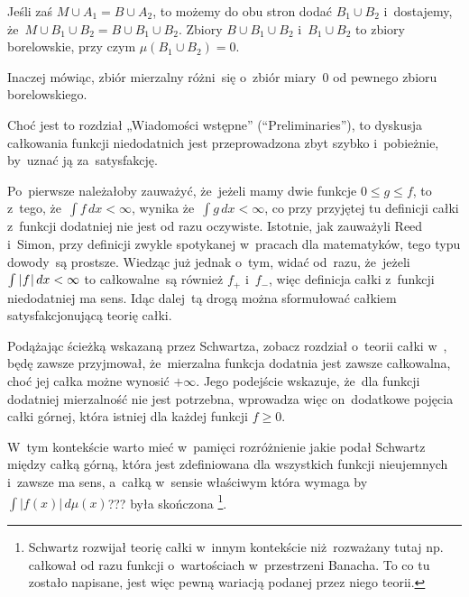 \documentclass[a4paper,11pt]{article}
\numberwithin{equation}{section}
\begin{document}
Jeśli zaś $M \cup A_{ 1 } = B \cup A_{ 2 }$, to możemy do obu stron
dodać $B_{ 1 } \cup B_{ 2 }$ i~dostajemy,
że~$M \cup B_{ 1 } \cup B_{ 2 } = B \cup B_{ 1 } \cup B_{ 2 }$. Zbiory
$B \cup B_{ 1 } \cup B_{ 2 }$ i~$B_{ 1 } \cup B_{ 2 }$ to zbiory
borelowskie, przy czym $\mu( B_{ 1 } \cup B_{ 2 } ) = 0$.

Inaczej mówiąc, zbiór mierzalny różni~się o~zbiór miary~0 od pewnego
zbioru borelowskiego. %

\VerSpaceFour





\noindent
{} Choć jest to rozdział „Wiadomości wstępne”
(``Preliminaries''), to dyskusja całkowania funkcji niedodatnich jest
przeprowadzona zbyt szybko i~pobieżnie, by~uznać ją za~satysfakcję.

Po~pierwsze należałoby zauważyć, że~jeżeli mamy dwie funkcje
$0 \leq g \leq f$, to z~tego, że~$\int f \, dx < \infty$, wynika
że~$\int g \, dx < \infty$, co przy przyjętej tu definicji całki
z~funkcji dodatniej nie jest od razu oczywiste. Istotnie, jak
zauważyli Reed i~Simon, przy definicji zwykle spotykanej w~pracach dla
matematyków, tego typu dowody~są prostsze. Wiedząc już jednak o~tym,
widać od~razu, że~jeżeli $\int | \hspace{0.05em}  f  \hspace{0.05em} | \, dx < \infty$ to
całkowalne~są również $f_{ + }$ i~$f_{ - }$, więc definicja całki
z~funkcji niedodatniej ma sens. Idąc dalej~tą drogą można sformułować
całkiem satysfakcjonującą teorię całki.

Podążając ścieżką wskazaną przez Schwartza, zobacz rozdział o~teorii
całki w~\cite{Schwartz-Kurs-analizy-matematycznej-Vol-I-Pub-1979}, będę
zawsze
przyjmował, że~mierzalna funkcja dodatnia jest zawsze całkowalna, choć
jej całka możne wynosić $+\infty$. Jego podejście wskazuje, że~dla
funkcji dodatniej mierzalność nie jest potrzebna, wprowadza więc
on~dodatkowe pojęcia całki górnej, która istniej dla każdej funkcji
$f \geq 0$. %

W~tym kontekście warto mieć w~pamięci rozróżnienie jakie podał
Schwartz między całką górną, która jest zdefiniowana dla wszystkich
funkcji nieujemnych i~zawsze ma sens, a~całką w~sensie właściwym
która wymaga by~$\int | f( x ) | \, d\mu( x )$??? była skończona
\cite{Schwartz-Kurs-analizy-matematycznej-Vol-I-Pub-1979}\footnote{Schwartz
  rozwijał teorię całki w~innym
kontekście niż~rozważany tutaj np. całkował od razu funkcji
o~wartościach w~przestrzeni Banacha. To co tu zostało napisane, jest
więc pewną wariacją podanej przez niego teorii.}.
\end{document}
